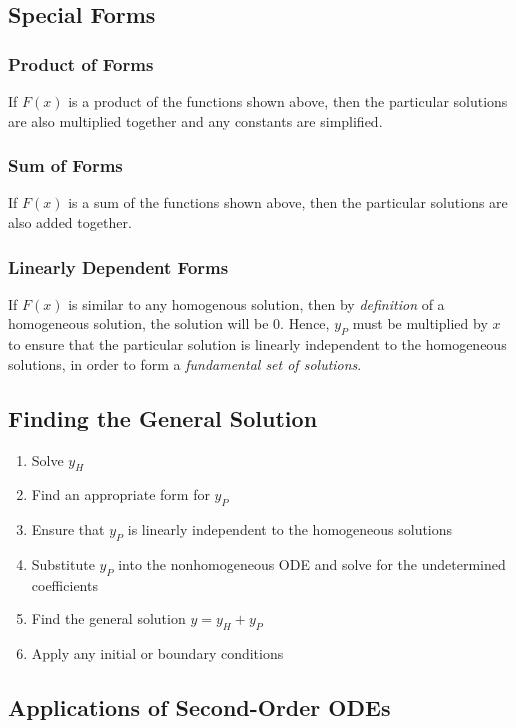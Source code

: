 \documentclass{article}
\begin{document}
\subsection{Special Forms}
\subsubsection{Product of Forms}
If \(F(x)\) is a product of the functions shown above, then the
particular solutions are also multiplied together and any constants are simplified.
\subsubsection{Sum of Forms}
If \(F(x)\) is a sum of the functions shown above, then the
particular solutions are also added together.
\subsubsection{Linearly Dependent Forms}
If \(F(x)\) is similar to any homogenous solution, then by \textit{definition} of
a homogeneous solution, the solution will be \(0\). Hence, \(y_P\) must be multiplied by \(x\)
to ensure that the particular solution is linearly independent to the homogeneous solutions,
in order to form a \textit{fundamental set of solutions}.
\subsection{Finding the General Solution}
\begin{enumerate}
    \item Solve \(y_H\)
    \item Find an appropriate form for \(y_P\)
    \item Ensure that \(y_P\) is linearly independent to the homogeneous solutions
    \item Substitute \(y_P\) into the nonhomogeneous ODE and solve for the undetermined coefficients
    \item Find the general solution \(y = y_H + y_P\)
    \item Apply any initial or boundary conditions
\end{enumerate}
\subsection{Applications of Second-Order ODEs}
\end{document}
